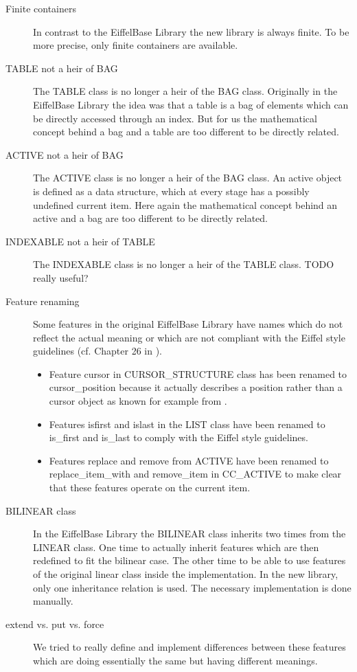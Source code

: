 \begin{description}
	\item [Finite containers] In contrast to the EiffelBase Library the new library is always finite. To be more precise, only finite containers are available.
	\item [TABLE not a heir of BAG] The TABLE class is no longer a heir of the BAG class. Originally in the EiffelBase Library the idea was that a table is a bag of elements which can be directly accessed through an index. But for us the mathematical concept behind a bag and a table are too different to be directly related.
	\item [ACTIVE not a heir of BAG] The ACTIVE class is no longer a heir of the BAG class. An active object is defined as a data structure, which at every stage has a possibly undefined current item. Here again the mathematical concept behind an active and a bag are too different to be directly related.
	\item [INDEXABLE not a heir of TABLE] The INDEXABLE class is no longer a heir of the TABLE class. TODO really useful?
	\item [Feature renaming] Some features in the original EiffelBase Library have names which do not reflect the actual meaning or which are not compliant with the Eiffel style guidelines (cf. Chapter 26 in \cite{Meyer97Object}).
	\begin{itemize}
		\item Feature cursor in CURSOR\_STRUCTURE class has been renamed to cursor\_position because it actually describes a position rather than a cursor object as known for example from \cite{Bezault07Gobo}.
		\item Features isfirst and islast in the LIST class have been renamed to is\_first and is\_last to comply with the Eiffel style guidelines.
		\item Features replace and remove from ACTIVE have been renamed to replace\_item\_with and remove\_item in CC\_ACTIVE to make clear that these features operate on the current item.
	\end{itemize}
	\item [BILINEAR class] In the EiffelBase Library the BILINEAR class inherits two times from the LINEAR class. One time to actually inherit features which are then redefined to fit the bilinear case. The other time to be able to use features of the original linear class inside the implementation. In the new library, only one inheritance relation is used. The necessary implementation is done manually.
	\item [extend vs. put vs. force] We tried to really define and implement differences between these features which are doing essentially the same but having different meanings.

\end{description}
